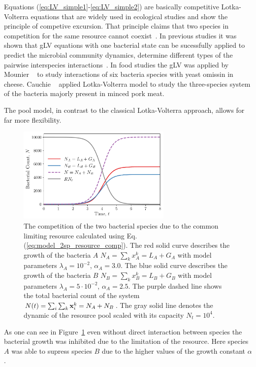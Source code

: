 \documentclass[10pt,A4paper]{article}
\begin{document}
Equations (\ref{eq:LV_simple1}-\ref{eq:LV_simple2}) are basically competitive Lotka-Volterra equations that are widely used in ecological studies and show the principle of competive excursion.
That principle claims that two species in competition for the same resource cannot coexist~\cite{wangersky_lotka-volterra_1978}. 
In previous studies it was shown that gLV equations with one bacterial state can be sucessfully applied to predict the microbial community dynamics, determine different types of the pairwise interspecies interactions~\cite{dedrick_when_2023, stein_ecological_2013, venturelli_deciphering_2018, hoffmann_power_2007}.
In food studies the gLV was applied by Mounier \etal~\cite{mounier_microbial_2008} to study interactions of six bacteria species  with yeast omissin in cheese.
Cauchie \etal~\cite{cauchie_modeling_2020} applied Lotka-Volterra model to study the three-species system of the bacteria majorly present in minced pork meat.

The pool model, in contrast to the classical Lotka-Volterra approach, allows for far more flexibility. 

\begin{figure}[H]
    \begin{center}
    \includegraphics[width=0.67\textwidth]{Figures/pool_model_2pools_resource_competition.pdf}
    \caption{{\footnotesize The competition of the two bacterial species due to the common limiting resource calculated using Eq. (\ref{eq:model_2sp_resource_comp}).
    The red solid curve describes the growth of the bacteria $A$ $N_A = \sum_{k} x_A^k = L_A+G_A$ with model parameters $\lambda_A=10^{-2}$, $\alpha_A=3.0$.
    The blue solid curve describes the growth of the bacteria $B$ $N_B = \sum_{k} x_B^k = L_B+G_B$ with model parameters $\lambda_A=5\cdot 10^{-2}$, $\alpha_A=2.5$.
    The purple dashed line shows the total bacterial count of the system  $N(t)=\sum_i\sum_k\mathbf{x}_i^k=N_A+N_B$.
    The gray solid line denotes the dynamic of the resource pool scaled with its capacity $N_t=10^4$.}}
    \label{fig:2pool_resource_2sp}
    \end{center}
\end{figure}
As one can see in Figure~\ref{fig:2pool_resource_2sp} even without direct interaction between species the bacterial growth was inhibited due to the limitation of the resource.
Here species $A$ was able to supress species $B$ due to the higher values of the growth constant $\alpha$.
\end{document}
